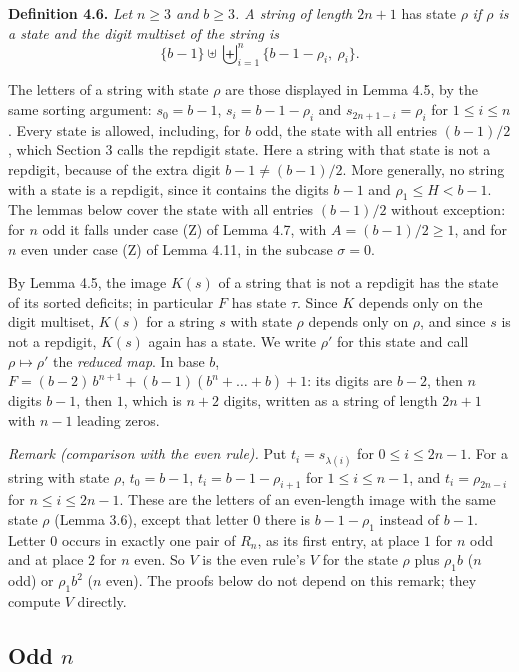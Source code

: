 \documentclass[11pt,letterpaper]{article}
\theoremstyle{paperstyle}
\theoremstyle{paperstyledef}
\theoremstyle{paperstylerem}
\begin{document}
\textbf{Definition 4.6.} \emph{Let \(n \geq 3\) and \(b \geq 3\). A string of length \(2n+1\)} has state \(\rho\) \emph{if \(\rho\) is a state and the digit multiset of the string is} \[\{b-1\} \uplus \biguplus_{i=1}^{n} \{b-1-\rho_i,\ \rho_i\}.\]

The letters of a string with state \(\rho\) are those displayed in Lemma 4.5, by the same sorting argument: \(s_0 = b-1\), \(s_i = b-1-\rho_i\) and \(s_{2n+1-i} = \rho_i\) for \(1 \leq i \leq n\). Every state is allowed, including, for \(b\) odd, the state with all entries \((b-1)/2\), which Section 3 calls the repdigit state. Here a string with that state is not a repdigit, because of the extra digit \(b-1 \neq (b-1)/2\). More generally, no string with a state is a repdigit, since it contains the digits \(b-1\) and \(\rho_1 \leq H < b-1\). The lemmas below cover the state with all entries \((b-1)/2\) without exception: for \(n\) odd it falls under case (Z) of Lemma 4.7, with \(A = (b-1)/2 \geq 1\), and for \(n\) even under case (Z) of Lemma 4.11, in the subcase \(\sigma = 0\).

By Lemma 4.5, the image \(K(s)\) of a string that is not a repdigit has the state of its sorted deficits; in particular \(F\) has state \(\tau\). Since \(K\) depends only on the digit multiset, \(K(s)\) for a string \(s\) with state \(\rho\) depends only on \(\rho\), and since \(s\) is not a repdigit, \(K(s)\) again has a state. We write \(\rho'\) for this state and call \(\rho \mapsto \rho'\) the \emph{reduced map}. In base \(b\), \(F = (b-2)\, b^{n+1} + (b-1)(b^n + \dots + b) + 1\): its digits are \(b-2\), then \(n\) digits \(b-1\), then \(1\), which is \(n+2\) digits, written as a string of length \(2n+1\) with \(n-1\) leading zeros.

\emph{Remark (comparison with the even rule).} Put \(t_i = s_{\lambda(i)}\) for \(0 \leq i \leq 2n-1\). For a string with state \(\rho\), \(t_0 = b-1\), \(t_i = b-1-\rho_{i+1}\) for \(1 \leq i \leq n-1\), and \(t_i = \rho_{2n-i}\) for \(n \leq i \leq 2n-1\). These are the letters of an even-length image with the same state \(\rho\) (Lemma 3.6), except that letter \(0\) there is \(b-1-\rho_1\) instead of \(b-1\). Letter \(0\) occurs in exactly one pair of \(R_n\), as its first entry, at place \(1\) for \(n\) odd and at place \(2\) for \(n\) even. So \(V\) is the even rule's \(V\) for the state \(\rho\) plus \(\rho_1 b\) (\(n\) odd) or \(\rho_1 b^2\) (\(n\) even). The proofs below do not depend on this remark; they compute \(V\) directly.

\subsection{\texorpdfstring{Odd \(n\)}{Odd n}}\label{odd-n}
\end{document}
